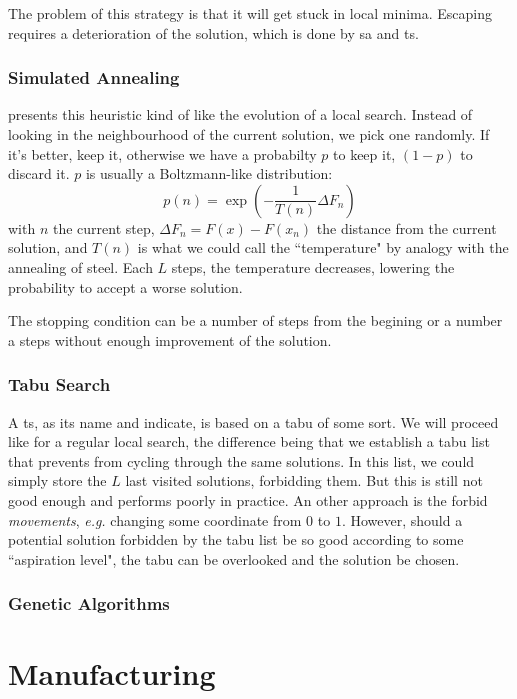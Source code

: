 \documentclass[12pt,a4paper]{article}
\begin{document}
The problem of this strategy is that it will get stuck in local minima.
Escaping requires a deterioration of the solution, which is done by \gls{sa} and \gls{ts}.

\subsubsection{Simulated Annealing}
\cite{Pirlot1996} presents this heuristic kind of like the evolution of a local search.
Instead of looking in the neighbourhood of the current solution, we pick one randomly.
If it's better, keep it, otherwise we have a probabilty $p$ to keep it, $(1-p)$ to discard it.
$p$ is usually a Boltzmann-like distribution:
\[p(n) = \exp{\left(-\frac{1}{T(n)} \Delta F_n\right)}\]
with $n$ the current step, $\Delta F_n = F(x) - F(x_n)$ the distance from the current solution, and $T(n)$ is what we could call the ``temperature" by analogy with the annealing of steel.
Each $L$ steps, the temperature decreases, lowering the probability to accept a worse solution.

The stopping condition can be a number of steps from the begining or a number a steps without enough improvement of the solution.

\subsubsection{Tabu Search}
A \acrlong{ts}, as its name and \cite{Pirlot1996} indicate, is based on a tabu of some sort.
We will proceed like for a regular local search, the difference being that we establish a tabu list that prevents from cycling through the same solutions.
In this list, we could simply store the $L$ last visited solutions, forbidding them.
But this is still not good enough and performs poorly in practice.
An other approach is the forbid \textit{movements}, \textit{e.g.} changing some coordinate from $0$ to $1$.
However, should a potential solution forbidden by the tabu list be so good according to some ``aspiration level", the tabu can be overlooked and the solution be chosen.

\subsubsection{Genetic Algorithms}




\section{Manufacturing}
\end{document}
